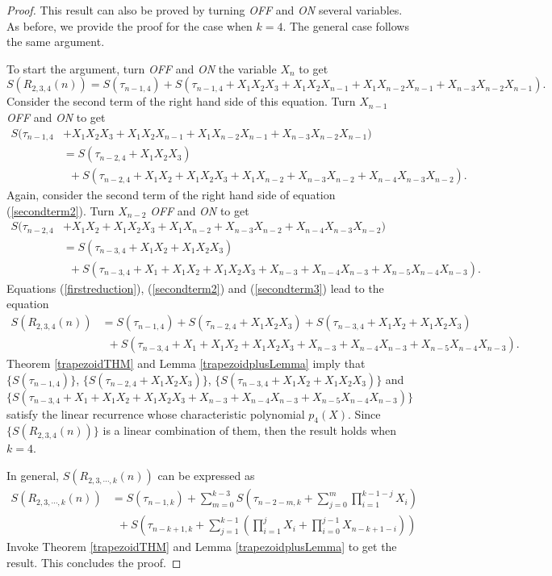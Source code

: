 \begin{proof}
 This result can also be proved by turning {\it OFF} and {\it ON} several variables.  As before, we provide the proof for the case when $k=4$.  The general case follows the same argument.
 
 To start the argument, turn {\it OFF} and {\it ON} the variable $X_n$ to get
 \begin{equation}
 \label{firstreduction}
  S(R_{2,3,4}(n)) = S(\tau_{n-1,4})+S(\tau_{n-1,4}+X_1X_2X_3+X_1X_2X_{n-1}+X_1X_{n-2}X_{n-1}+X_{n-3}X_{n-2}X_{n-1}).
 \end{equation}
Consider the second term of the right hand side of this equation.  Turn $X_{n-1}$ {\it OFF} and {\it ON} to get
\begin{align}
\label{secondterm2}
 S(\tau_{n-1,4}&+X_1X_2X_3+X_1X_2X_{n-1}+X_1X_{n-2}X_{n-1}+X_{n-3}X_{n-2}X_{n-1})\\\nonumber
 &=S(\tau_{n-2,4}+X_1X_2X_3)\\\nonumber
 &\,\,\,+S(\tau_{n-2,4}+X_1X_2+X_1X_2X_3+X_1X_{n-2}+X_{n-3}X_{n-2}+X_{n-4}X_{n-3}X_{n-2}).
\end{align}
Again, consider the second term of the right hand side of equation (\ref{secondterm2}). Turn $X_{n-2}$ {\it OFF} and {\it ON} to get
\begin{align}
\label{secondterm3}
 S(\tau_{n-2,4}&+X_1X_2+X_1X_2X_3+X_1X_{n-2}+X_{n-3}X_{n-2}+X_{n-4}X_{n-3}X_{n-2})\\\nonumber
 &=S(\tau_{n-3,4}+X_1X_2+X_1X_2X_3)\\\nonumber
 &\,\,\,+S(\tau_{n-3,4}+X_1+X_1X_2+X_1X_2X_3+X_{n-3}+X_{n-4}X_{n-3}+X_{n-5}X_{n-4}X_{n-3}).
\end{align}
Equations (\ref{firstreduction}), (\ref{secondterm2}) and (\ref{secondterm3}) lead to the equation
 \begin{align}
  S(R_{2,3,4}(n)) &= S(\tau_{n-1,4})+S(\tau_{n-2,4}+X_1X_2X_3)+S(\tau_{n-3,4}+X_1X_2+X_1X_2X_3)\\\nonumber
  & \,\,\,+S(\tau_{n-3,4}+X_1+X_1X_2+X_1X_2X_3+X_{n-3}+X_{n-4}X_{n-3}+X_{n-5}X_{n-4}X_{n-3}).
 \end{align}
Theorem \ref{trapezoidTHM} and Lemma \ref{trapezoidplusLemma} imply that $\{S(\tau_{n-1,4})\}$,  $\{S(\tau_{n-2,4}+X_1X_2X_3)\}$, $\{S(\tau_{n-3,4}+X_1X_2+X_1X_2X_3)\}$ and
$$\{S(\tau_{n-3,4}+X_1+X_1X_2+X_1X_2X_3+X_{n-3}+X_{n-4}X_{n-3}+X_{n-5}X_{n-4}X_{n-3})\}$$
satisfy the linear recurrence whose characteristic polynomial $p_4(X)$.  Since $\{S(R_{2,3,4}(n))\}$ is a linear combination of them, then the result holds when $k=4$.

In general, $S(R_{2,3,\cdots, k}(n))$ can be expressed as
\begin{align}
S(R_{2,3,\cdots, k}(n))&=S(\tau_{n-1,k})+\sum_{m=0}^{k-3} S\left(\tau_{n-2-m,k}+\sum_{j=0}^m \prod_{i=1}^{k-1-j} X_i\right)\\\nonumber
&\,\,\,+S\left(\tau_{n-k+1,k}+\sum_{j=1}^{k-1} \left(\prod_{i=1}^{j} X_i+ \prod_{i=0}^{j-1} X_{n-k+1-i}\right)\right)
\end{align}
Invoke Theorem \ref{trapezoidTHM} and Lemma \ref{trapezoidplusLemma} to get the result.  This concludes the proof.
\end{proof}
